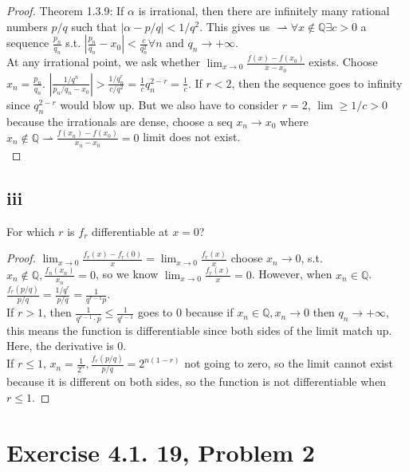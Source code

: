 \documentclass{article}
\begin{document}
\begin{proof}
 Theorem 1.3.9: If $\alpha$ is irrational, then there are infinitely many rational numbers $p/q$ such that $|\alpha - p/q| < 1/q^2$. This gives us $\rightharpoonup \forall x \notin \mathbb{Q} \exists c>0$ a sequence $\frac{p_n}{q_n}$ s.t. $|\frac{p_n}{q_n}-x_0| < \frac{c}{q^2_n} \forall n$ and $q_n \rightarrow + \infty$. \\
 At any irrational point, we ask whether $\lim_{x \rightarrow 0} \frac{f(x)-f(x_0)}{x-x_0}$ exists. Choose $x_n = \frac{p_n} {q_n}$. $|\frac{1/q^n}{p_n/q_n-x_0}|>\frac{1/q^r_n}{c/q^2} = \frac{1}{c}q_n^{2-r}=\frac{1}{c}$. 
 If $r < 2$, then the sequence goes to infinity since $q_n^{2-r}$ would blow up. But we also have to consider $r=2$, $\lim \geq 1/c > 0 $ because the irrationals are dense, choose a seq $x_n \rightarrow x_0$ where $x_n \notin \mathbb{Q} \rightharpoonup \frac{f(x_n)-f(x_0)}{x_n-x_0} = 0$ limit does not exist. \\


 

\end{proof}

\subsection*{iii} For which $r$ is $f_r$ differentiable at $x=0$?
\begin{proof}
     $\lim_{x\rightarrow 0}\frac{f_r(x)-f_r(0)}{x} = \lim_{x\rightarrow 0} \frac{f_r(x)}{x}$ choose $x_n \rightarrow 0$, s.t. $x_n \notin \mathbb{Q}, \frac{f_n(x_n)}{x_n} = 0$, so we know $\lim_{x\rightarrow 0} \frac{f_r(x)}{x}=0$. However, when $x_n \in \mathbb{Q}$.
     $\frac{f_r(p/q)}{p/q}=\frac{1/q^r}{p/q}=\frac{1}{q^{r-1}p}$. \\
     If $r>1$, then $\frac{1}{q^{r-1} \cdot p} \leq \frac{1}{q^{r-1}}$ goes to 0 because if $x_n \in \mathbb{Q}, x_n \rightarrow 0$ then $q_n \rightarrow + \infty$, this means the function is differentiable since both sides of the limit match up. Here, the derivative is 0. \\
     If $r \leq 1$, $x_n = \frac{1}{2^n}, \frac{f_r(p/q)}{p/q}= 2^{n(1-r)}$ not going to zero, so the limit cannot exist because it is different on both sides, so the function is not differentiable when $r \leq 1$. 
\end{proof}

\clearpage %
\section*{Exercise 4.1. 19, Problem 2}
\end{document}
